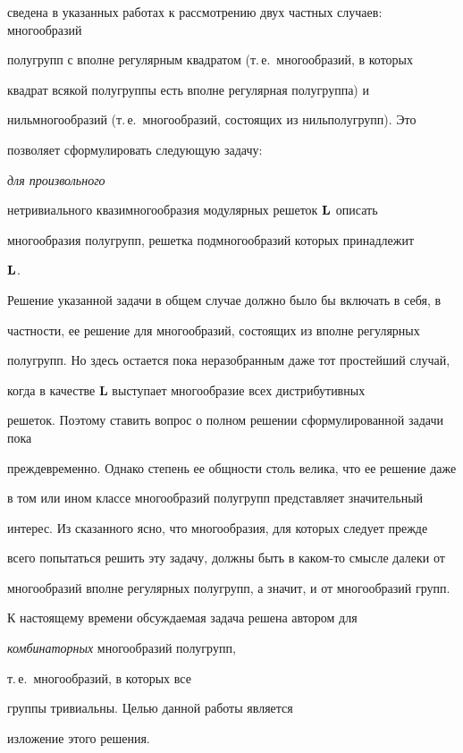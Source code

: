 сведена в указанных работах к рассмотрению двух частных случаев: многообразий


полугрупп с вполне регулярным квадратом (т.\,е.\ многообразий, в которых


квадрат всякой полугруппы есть вполне регулярная полугруппа) и


нильмногообразий (т.\,е.\ многообразий, состоящих из нильполугрупп). Это


позволяет сформулировать следующую задачу: {\em для произвольного


нетривиального квазимногообразия модулярных решеток $\bold L$ описать


многообразия полугрупп, решетка подмногообразий которых принадлежит} $\bold


L$.





Решение указанной задачи в общем случае должно было бы включать в себя, в


частности, ее решение для многообразий, состоящих из вполне регулярных


полугрупп. Но здесь остается пока неразобранным даже тот простейший случай,


когда в качестве {\bf L} выступает многообразие всех дистрибутивных


решеток. Поэтому ставить вопрос о полном решении сформулированной задачи пока


преждевременно. Однако степень ее общности столь велика, что ее решение даже


в том или ином классе многообразий полугрупп представляет значительный


интерес. Из сказанного ясно, что многообразия, для которых следует прежде


всего попытаться решить эту задачу, должны быть в каком-то смысле далеки от


многообразий вполне регулярных полугрупп, а значит, и от многообразий групп.





К настоящему времени обсуждаемая задача решена автором для 


{\em комбинаторных} многообразий полугрупп,


т.\,е.\ многообразий, в которых все


группы тривиальны. Целью данной работы является


изложение этого решения.





